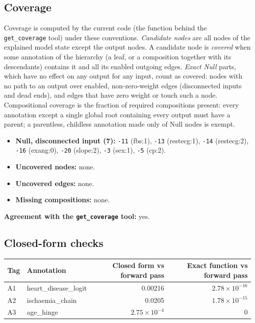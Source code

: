 \begin{drafted}
\subsection{Coverage}\label{app:heart-s5-c3:coverage}
Coverage is computed by the current code (the function behind the \texttt{get\_coverage} tool) under these conventions. \emph{Candidate nodes} are all nodes of the explained model state except the output nodes. A candidate node is \emph{covered} when some annotation of the hierarchy (a leaf, or a composition together with its descendants) contains it and all its enabled outgoing edges. \emph{Exact Null} parts, which have no effect on any output for any input, count as covered: nodes with no path to an output over enabled, non-zero-weight edges (disconnected inputs and dead ends), and edges that have zero weight or touch such a node. Compositional coverage is the fraction of required compositions present: every annotation except a single global root containing every output must have a parent; a parentless, childless annotation made only of Null nodes is exempt.

\begin{itemize}
\item \textbf{Null, disconnected input (7):} \texttt{-11} (fbs:1), \texttt{-13} (restecg:1), \texttt{-14} (restecg:2), \texttt{-16} (exang:0), \texttt{-20} (slope:2), \texttt{-3} (sex:1), \texttt{-5} (cp:2).
\item \textbf{Uncovered nodes:} none.
\item \textbf{Uncovered edges:} none.
\item \textbf{Missing compositions:} none.
\end{itemize}
\noindent\textbf{Agreement with the \texttt{get\_coverage} tool:} yes.

\subsection{Closed-form checks}\label{app:heart-s5-c3:closedform}
{\small\noindent\begin{tabularx}{\linewidth}{@{}lXrr@{}}
\toprule Tag & Annotation & Closed form vs forward pass & Exact function vs forward pass \\ \midrule
A1 & heart\_\allowbreak{}disease\_\allowbreak{}logit & 0.00216 & $2.78\times 10^{-16}$ \\
A2 & ischaemia\_\allowbreak{}chain & 0.0205 & $1.78\times 10^{-15}$ \\
A3 & age\_\allowbreak{}hinge & $2.75\times 10^{-4}$ & 0 \\
\bottomrule
\end{tabularx}\par}

\end{drafted}
